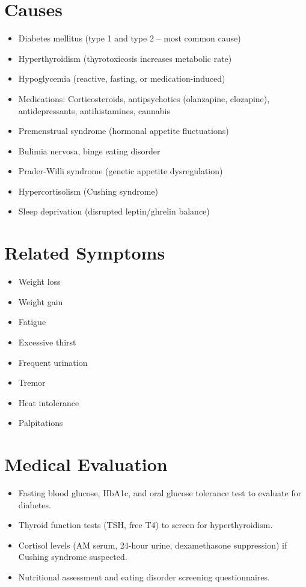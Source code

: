 \section*{Causes}
\begin{itemize}
  \item Diabetes mellitus (type 1 and type 2 -- most common cause)
  \item Hyperthyroidism (thyrotoxicosis increases metabolic rate)
  \item Hypoglycemia (reactive, fasting, or medication-induced)
  \item Medications: Corticosteroids, antipsychotics (olanzapine, clozapine), antidepressants, antihistamines, cannabis
  \item Premenstrual syndrome (hormonal appetite fluctuations)
  \item Bulimia nervosa, binge eating disorder
  \item Prader-Willi syndrome (genetic appetite dysregulation)
  \item Hypercortisolism (Cushing syndrome)
  \item Sleep deprivation (disrupted leptin/ghrelin balance)
\end{itemize}

\section*{Related Symptoms}
\begin{itemize}
  \item Weight loss
  \item Weight gain
  \item Fatigue
  \item Excessive thirst
  \item Frequent urination
  \item Tremor
  \item Heat intolerance
  \item Palpitations
\end{itemize}

\section*{Medical Evaluation}
\begin{itemize}
  \item Fasting blood glucose, HbA1c, and oral glucose tolerance test to evaluate for diabetes.
  \item Thyroid function tests (TSH, free T4) to screen for hyperthyroidism.
  \item Cortisol levels (AM serum, 24-hour urine, dexamethasone suppression) if Cushing syndrome suspected.
  \item Nutritional assessment and eating disorder screening questionnaires.
\end{itemize}

